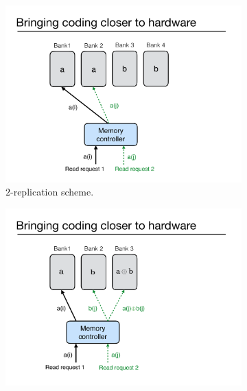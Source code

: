 \begin{figure}[t!]
\begin{subfigure}{0.52\linewidth}
  \centering
  \includegraphics[height=0.92\textwidth]{figures/read-replication.pdf} 
  \caption{$2$-replication scheme.}
  \label{fig:emulation_r}
\end{subfigure}
\begin{subfigure}{0.43\linewidth}
  \centering
  \includegraphics[height=1.1\textwidth]{figures/example-xor.pdf} 

\end{subfigure}
\end{figure}
